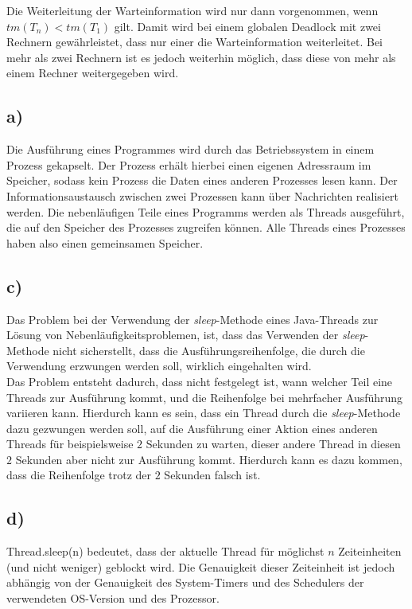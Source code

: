 \documentclass[ngerman]{fbi-aufgabenblatt}
\begin{document}
Die Weiterleitung der Warteinformation wird nur dann vorgenommen, wenn 
$tm (T_{n}) < tm (T_{1})$ gilt. Damit wird bei einem globalen Deadlock mit zwei Rechnern gewährleistet, dass nur einer die Warteinformation weiterleitet. Bei mehr als zwei Rechnern ist es jedoch weiterhin möglich, dass diese von mehr als einem Rechner weitergegeben wird.


\subsection*{a)}
Die Ausführung eines Programmes wird durch das Betriebssystem in einem Prozess gekapselt. Der Prozess erhält hierbei einen eigenen Adressraum im Speicher, sodass kein Prozess die Daten eines anderen Prozesses lesen kann. Der Informationsaustausch zwischen zwei Prozessen kann über Nachrichten realisiert werden. Die nebenläufigen Teile eines Programms werden als Threads ausgeführt, die auf den Speicher des Prozesses zugreifen können. Alle Threads eines Prozesses haben also einen gemeinsamen Speicher.

\subsection*{c)}
Das Problem bei der Verwendung der \textit{sleep}-Methode eines Java-Threads zur Lösung von Nebenläufigkeitsproblemen, ist, dass das Verwenden der \textit{sleep}-Methode nicht sicherstellt, dass die Ausführungsreihenfolge, die durch die Verwendung erzwungen werden soll, wirklich eingehalten wird. \\

Das Problem entsteht dadurch, dass nicht festgelegt ist, wann welcher Teil eine Threads zur Ausführung kommt, und die Reihenfolge bei mehrfacher Ausführung variieren kann. Hierdurch kann es sein, dass ein Thread durch die \textit{sleep}-Methode dazu gezwungen werden soll, auf die Ausführung einer Aktion eines anderen Threads für beispielsweise $2$ Sekunden zu warten, dieser andere Thread in diesen $2$ Sekunden aber nicht zur Ausführung kommt. Hierdurch kann es dazu kommen, dass die Reihenfolge trotz der $2$ Sekunden falsch ist.
\subsection*{d)}
Thread.sleep(n) bedeutet, dass der aktuelle Thread für möglichst $n$ Zeiteinheiten (und nicht weniger) geblockt wird. Die Genauigkeit dieser Zeiteinheit ist jedoch abhängig von der Genauigkeit des System-Timers und des Schedulers der verwendeten OS-Version und des Prozessor.
\end{document}
